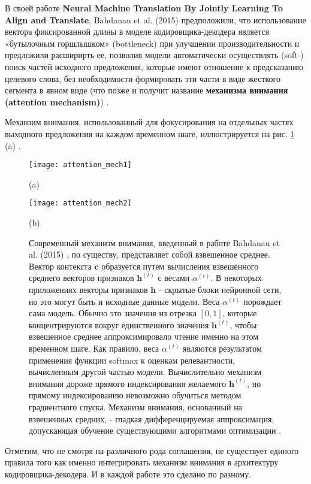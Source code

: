 В своей работе \textbf{Neural Machine Translation By Jointly Learning To 
Align and Translate}, Bahdanau et al. (2015) предположили, 
что использование вектора фиксированной длины в моделе кодировщика-декодера 
является «бутылочным горшлышком» (bottleneck) при улучшении производительности 
и предложили расширирть ее, позволив модели автоматически осуществлять (soft-) 
поиск частей исходного предложения, которые имеют отношение к предсказанию целевого 
слова, без необходимости формировать эти части в виде жесткого сегмента в явном виде 
(что позже и получит название \textbf{механизма внимания (attention mechanism)})
\cite{attention_mech}.

Механзим внимания, использованный для фокусирования на отдельных частях выходного 
предложения на каждом временном шаге, иллюстрируется на рис. \ref{fig:attention_mechs} (a) 
\cite{Goodfellow-et-al-2016}.

\begin{figure}[htbp]
    \centering
    \begin{minipage}{0.35\textwidth}
        \texttt{[image: attention\_mech1]}
        \caption*{(a)}
        \label{fig:attention_mech1}
    \end{minipage}
    \hspace{30pt}
    \begin{minipage}{0.55\textwidth}
        \texttt{[image: attention\_mech2]}
        \caption*{(b)}
        \label{fig:attention_mech2}
    \end{minipage}
    \caption{Современный механизм внимания, введенный в работе
    Bahdanau et al. (2015) \cite{attention_mech}, 
    по существу, представляет собой взвешенное
    среднее. Вектор контекста $\bm{c}$ образуется путем вычисления взвешенного
    среднего векторов признаков $\bm{h}^{(t)}$ с весами $\alpha^{(t)}$. 
    В некоторых приложениях
    векторы признаков $\bm{h}$ - скрытые блоки нейронной сети, но это могут быть
    и исходные данные модели. Веса $\alpha^{(t)}$ порождает сама модель. Обычно это
    значения из отрезка $[0, 1]$, которые концентрируются вокруг единственного
    значения $\bm{h}^{(t)}$, чтобы взвешенное среднее аппроксимировало чтение 
    именно на этом временном шаге. Как правило, веса $\alpha^{(t)}$ являются результатом
    применения функции softmax к оценкам релевантности, вычисленным другой 
    частью модели. Вычислительно механизм внимания дороже прямого
    индексирования желаемого $\bm{h}^{(t)}$, но прямому индексированию невозможно
    обучиться методом градиентного спуска. Механизм внимания, основанный
    на взвешенных средних, - гладкая дифференцируемая аппроксимация, допускающая 
    обучение существующими алгоритмами оптимизации \cite{Goodfellow-et-al-2016}.}
    \label{fig:attention_mechs}
\end{figure}

Отметим, что не смотря на различного рода соглашения, не существует единого правила 
того как именно интегрировать механизм внимания в архитектуру кодировщика-декодера. 
И в каждой работе это сделано по разному.


